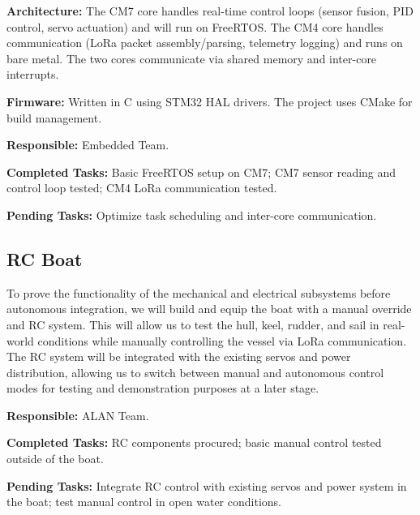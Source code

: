\textbf{Architecture:} The CM7 core handles real-time control loops (sensor fusion, PID control, servo actuation) and will run on FreeRTOS. The CM4 core handles communication (LoRa packet assembly/parsing, telemetry logging) and runs on bare metal. The two cores communicate via shared memory and inter-core interrupts.

\textbf{Firmware:} Written in C using STM32 HAL drivers. The project uses CMake for build management.

\textbf{Responsible:} Embedded Team.

\textbf{Completed Tasks:} Basic FreeRTOS setup on CM7; CM7 sensor reading and control loop tested; CM4 LoRa communication tested.

\textbf{Pending Tasks:} Optimize task scheduling and inter-core communication.


\subsection{RC Boat}

To prove the functionality of the mechanical and electrical subsystems before autonomous integration, we will build and equip the boat with a manual override and RC system. This will allow us to test the hull, keel, rudder, and sail in real-world conditions while manually controlling the vessel via LoRa communication. The RC system will be integrated with the existing servos and power distribution, allowing us to switch between manual and autonomous control modes for testing and demonstration purposes at a later stage.

\textbf{Responsible:} ALAN Team.

\textbf{Completed Tasks:} RC components procured; basic manual control tested outside of the boat.

\textbf{Pending Tasks:} Integrate RC control with existing servos and power system in the boat; test manual control in open water conditions.

